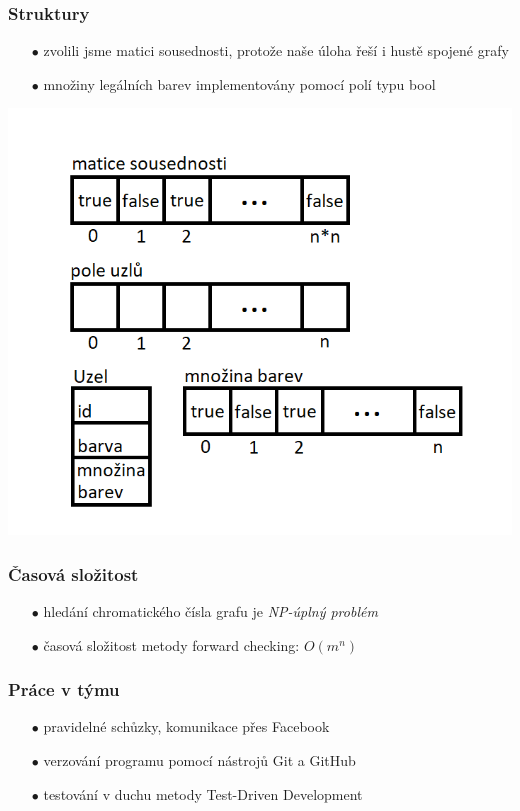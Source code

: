 \documentclass[10pt,xcolor=pdflatex]{beamer}
\begin{document}
\begin{frame}\frametitle{Struktury}
    \begin{itemize}
	\item[$\bullet$] zvolili jsme matici sousednosti, protože naše úloha řeší i hustě spojené grafy
	\item[$\bullet$] množiny legálních barev implementovány pomocí polí typu bool
	\end{itemize}
    \includegraphics[scale=0.58]{img/structures.png}
\end{frame}

\begin{frame}\frametitle{Časová složitost}
	\begin{itemize}
	\item[$\bullet$] hledání chromatického čísla grafu je \emph{NP-úplný problém}
    \item[$\bullet$] časová složitost metody forward checking: \emph{$O(m^n)$}
    \end{itemize}
\end{frame}

\begin{frame}\frametitle{Práce v týmu}
    \begin{itemize}
	\item[$\bullet$] pravidelné schůzky, komunikace přes Facebook
	\item[$\bullet$] verzování programu pomocí nástrojů Git a GitHub
	\item[$\bullet$] testování v duchu metody Test-Driven Development
	\end{itemize}
\end{frame}

\end{document}
